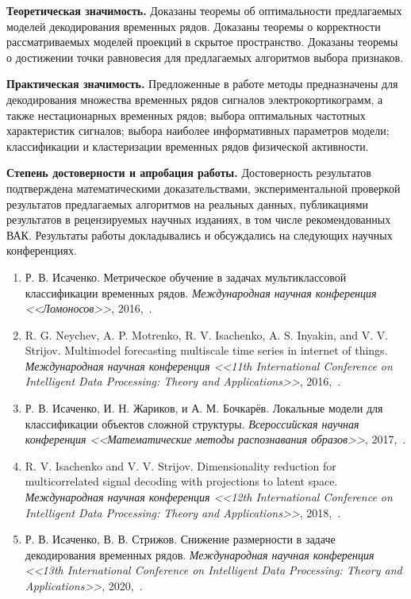 \vspace{0.5cm}
\textbf{Теоретическая значимость.}
Доказаны теоремы об оптимальности предлагаемых моделей декодирования временных рядов.
Доказаны теоремы о корректности рассматриваемых моделей проекций в скрытое пространство.
Доказаны теоремы о достижении точки равновесия для предлагаемых алгоритмов выбора признаков. 

\vspace{0.5cm}
\textbf{Практическая значимость.}
Предложенные в работе методы предназначены для декодирования множества временных рядов сигналов электрокортикограмм, а также нестационарных временных рядов; выбора оптимальных частотных характеристик сигналов; выбора наиболее информативных параметров модели; классификации и кластеризации временных рядов физической активности.

\vspace{0.5cm}
\textbf{Степень достоверности и апробация работы.}
Достоверность результатов подтверждена математическими доказательствами, экспериментальной проверкой результатов предлагаемых алгоритмов на реальных данных, публикациями результатов в рецензируемых научных изданиях, в том числе рекомендованных ВАК. 
Результаты работы докладывались и обсуждались на следующих научных конференциях.
\begin{enumerate}
	\item Р. В. Исаченко. Метрическое обучение в задачах мультиклассовой классификации временных рядов. \textit{Международная научная конференция <<Ломоносов>>}, 2016,~\cite{isachenko2016lomonosov}.
	\item R. G. Neychev, A. P. Motrenko, R. V. Isachenko, A. S. Inyakin, and V. V. Strijov. Multimodel forecasting multiscale time series in internet of things. \textit{Международная научная конференция  <<11th International Conference on Intelligent Data Processing: Theory and Applications>>}, 2016,~\cite{Neychev2016IDP}.
	\item Р. В. Исаченко, И. Н. Жариков, и А. М. Бочкарёв. Локальные модели для классификации объектов сложной структуры. \textit{Всероссийская научная конференция <<Математические методы распознавания образов>>}, 2017,~\cite{isachenko2017localmmro}.
	\item R. V. Isachenko and V. V. Strijov. Dimensionality reduction for multicorrelated signal decoding with projections to latent space. \textit{Международная научная конференция  <<12th International Conference on Intelligent Data Processing: Theory and Applications>>}, 2018,~\cite{Isachenko2018plsidp}.
	\item Р. В. Исаченко, В. В. Стрижов. Снижение размерности в задаче декодирования временных рядов. \textit{Международная научная конференция  <<13th International Conference on Intelligent Data Processing: Theory and Applications>>}, 2020,~\cite{Isachenko2020plsidp}.
\end{enumerate} 

